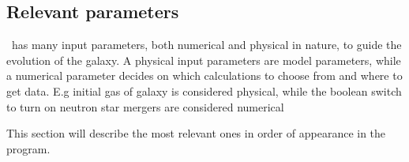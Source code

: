 \begin{figure}[h]
  \begin{minipage}[t][][t]{0.45\textwidth}
    \setlength\figwidth{\linewidth}
    
  \end{minipage}
  \hfill
  \begin{minipage}[t][][t]{0.45\textwidth}
    \setlength\figwidth{\linewidth}
    
  \end{minipage}
\end{figure}

\FloatBarrier

\subsection{Relevant parameters}
\label{sec:omega-parameters}
\omegamodel\ has many input parameters, both numerical and physical in nature, to guide the evolution of the galaxy. A physical input parameters are model parameters, while a numerical parameter decides on which calculations to choose from and where to get data. E.g initial gas of galaxy is considered physical, while the boolean switch to turn on neutron star mergers are considered numerical

This section will describe the most relevant ones in order of appearance in the program.

